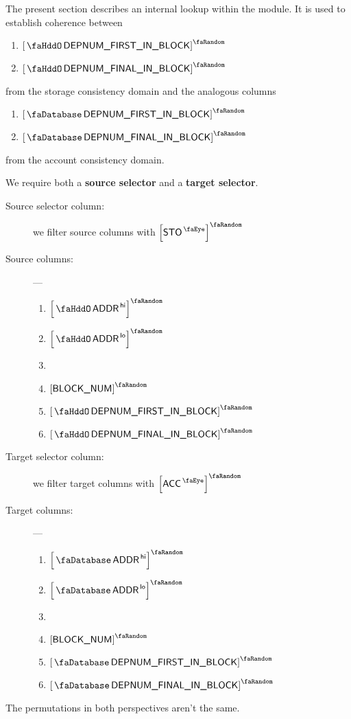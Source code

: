The present section describes an internal lookup within the \hubMod{} module.
It is used to establish coherence between
\begin{multicols}{2}
	\begin{enumerate}
		\item $\order{\stoDeploymentNumberFirstInBlock}$
		\item $\order{\stoDeploymentNumberFinalInBlock}$
	\end{enumerate}
\end{multicols}
\noindent from the storage consistency domain and the analogous columns
\begin{multicols}{2}
	\begin{enumerate}
		\item $\order{\accDeploymentNumberFirstInBlock}$
		\item $\order{\accDeploymentNumberFinalInBlock}$
	\end{enumerate}
\end{multicols}
\noindent from the account consistency domain.

\saNote{} We require both a \textbf{source selector} and a \textbf{target selector}.
\begin{description}
	\item[Source selector column:]
		we filter source columns with
		$\order{\peekStorage}$
	\item[Source columns:] ---
		\begin{multicols}{2}
			\begin{enumerate}
				\item $\order{\stoAddressHi}$
				\item $\order{\stoAddressLo}$
				\item[\vspace{\fill}]
				\item $\order{\relBlockNum}$
				\item $\order{\stoDeploymentNumberFirstInBlock}$
				\item $\order{\stoDeploymentNumberFinalInBlock}$
			\end{enumerate}
		\end{multicols}
	\item[Target selector column:]
		we filter target columns with
		$\order{\peekAccount}$
	\item[Target columns:] ---
		\begin{multicols}{2}
			\begin{enumerate}
				\item $\order{\accAddressHi}$
				\item $\order{\accAddressLo}$
				\item[\vspace{\fill}]
				\item $\order{\relBlockNum}$
				\item $\order{\accDeploymentNumberFirstInBlock}$
				\item $\order{\accDeploymentNumberFinalInBlock}$
			\end{enumerate}
		\end{multicols}
\end{description}
\saNote{} The permutations in both perspectives aren't the same.
